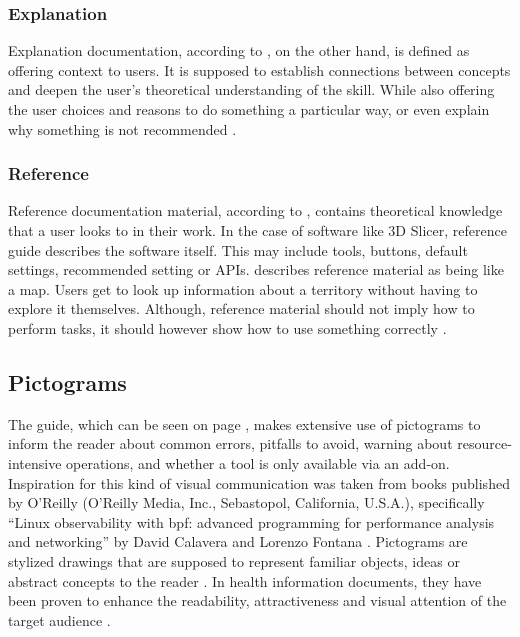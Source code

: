 \subsubsection*{Explanation}
Explanation documentation, according to \citeauthor{procidaDiataxisDocumentationFramework2023}, on the other hand, is defined as offering context to users.
It is supposed to establish connections between concepts and deepen the user's theoretical understanding of the skill.
While also offering the user choices and reasons to do something a particular way, or even explain why something is not recommended \cite{procidaPythonDocsCommunity2022,procidaDiataxisDocumentationFramework2023}.

\subsubsection*{Reference}
Reference documentation material, according to \citeauthor{procidaDiataxisDocumentationFramework2023}, contains theoretical knowledge that a user looks to in their work.
In the case of software like 3D Slicer, reference guide describes the software itself.
This may include tools, buttons, default settings, recommended setting or APIs.
\citeauthor{procidaDiataxisDocumentationFramework2023} describes reference material as being like a map.
Users get to look up information about a territory without having to explore it themselves.
Although, reference material should not imply how to perform tasks, it should however show how to use something correctly \cite{procidaPythonDocsCommunity2022,procidaDiataxisDocumentationFramework2023}.


\subsection{Pictograms}\label{s:b-pictograms}
The guide, which can be seen on page \pageref{a:guide}, makes extensive use of pictograms to inform the reader about common errors,
pitfalls to avoid, warning about resource-intensive operations, and whether a tool is only available via an add-on.
Inspiration for this kind of visual communication was taken from books published by O'Reilly (O'Reilly Media, Inc., Sebastopol, California, U.S.A.), specifically ``Linux observability with \acrshort{bpf}: advanced programming for performance analysis and networking'' by David Calavera and Lorenzo Fontana \cite{calaveraLinuxObservabilityBPF2019}.
Pictograms are stylized drawings that are supposed to represent familiar objects, ideas or abstract concepts to the reader \cite{dowsePharmacistsAreWords2021}.
In health information documents, they have been proven to enhance the readability, attractiveness and visual attention of the target audience \cite{houtsRolePicturesImproving2006,mansoorEffectPictogramsReadability2003}.\\


